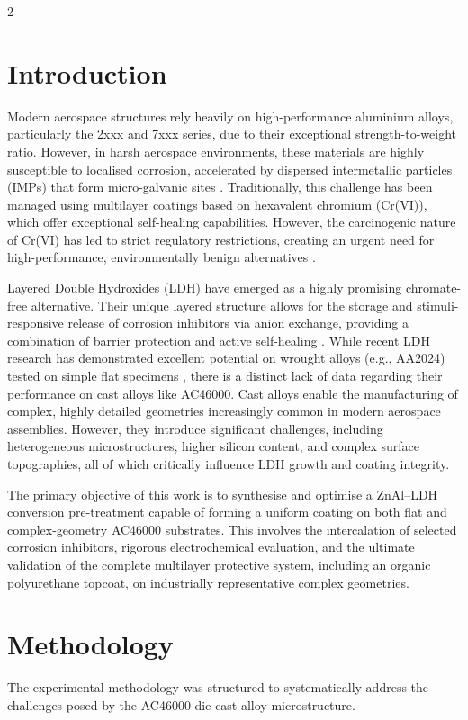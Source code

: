 \documentclass[a4paper,10pt]{article}
\begin{document}
\begin{multicols}{2}
\raggedcolumns 

\section{Introduction}
Modern aerospace structures rely heavily on high-performance aluminium alloys, particularly the 2xxx and 7xxx series, due to their exceptional strength-to-weight ratio. However, in harsh aerospace environments, these materials are highly susceptible to localised corrosion, accelerated by dispersed intermetallic particles (IMPs) that form micro-galvanic sites \cite{MartinezViademonte2020, Garg2025}. Traditionally, this challenge has been managed using multilayer coatings based on hexavalent chromium (Cr(VI)), which offer exceptional self-healing capabilities. However, the carcinogenic nature of Cr(VI) has led to strict regulatory restrictions, creating an urgent need for high-performance, environmentally benign alternatives \cite{Becker2019, BoualiReview2020}.

Layered Double Hydroxides (LDH) have emerged as a highly promising chromate-free alternative. Their unique layered structure allows for the storage and stimuli-responsive release of corrosion inhibitors via anion exchange, providing a combination of barrier protection and active self-healing \cite{Cao2022, Yasakau2018, Zhou2017}. While recent LDH research has demonstrated excellent potential on wrought alloys (e.g., AA2024) tested on simple flat specimens \cite{Tedim2014, Tedim2011, He2020}, there is a distinct lack of data regarding their performance on cast alloys like AC46000. Cast alloys enable the manufacturing of complex, highly detailed geometries increasingly common in modern aerospace assemblies. However, they introduce significant challenges, including heterogeneous microstructures, higher silicon content, and complex surface topographies, all of which critically influence LDH growth and coating integrity.

The primary objective of this work is to synthesise and optimise a ZnAl--LDH conversion pre-treatment capable of forming a uniform coating on both flat and complex-geometry AC46000 substrates. This involves the intercalation of selected corrosion inhibitors, rigorous electrochemical evaluation, and the ultimate validation of the complete multilayer protective system, including an organic polyurethane topcoat, on industrially representative complex geometries.

\section{Methodology}
The experimental methodology was structured to systematically address the challenges posed by the AC46000 die-cast alloy microstructure. 


\end{multicols}
\end{document}
